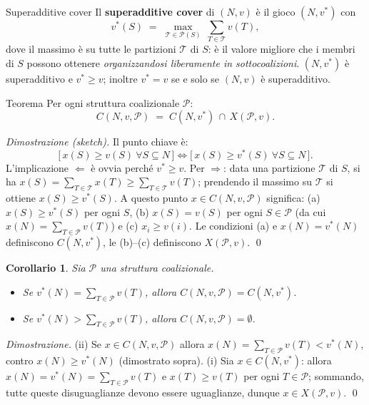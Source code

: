 \documentclass[12pt,a4paper,twoside]{book}
\theoremstyle{plain}
\newtheorem{corollary}[theorem]{Corollario}
\theoremstyle{definition}
\begin{document}
\begin{defbox}{Superadditive cover}
Il \textbf{superadditive cover} di $(N,v)$ è il gioco $(N,v^{*})$ con
\[
  v^{*}(S)\;=\;\max_{\mathcal{T}\in\mathcal{P}(S)}\ \sum_{T\in\mathcal{T}} v(T),
\]
dove il massimo è su tutte le partizioni $\mathcal{T}$ di $S$: è il valore
migliore che i membri di $S$ possono ottenere \emph{organizzandosi
liberamente in sottocoalizioni}. $(N,v^{*})$ è superadditivo e $v^{*}\ge v$;
inoltre $v^{*}=v$ se e solo se $(N,v)$ è superadditivo.
\end{defbox}

\begin{thmbox}{Teorema}
Per ogni struttura coalizionale $\mathcal{P}$:
\[
  C(N,v,\mathcal{P})\;=\;C(N,v^{*})\,\cap\,X(\mathcal{P},v).
\]
\end{thmbox}

\textit{Dimostrazione (sketch).} Il punto chiave è:
\[
  \bigl[\,x(S)\ge v(S)\ \forall S\subseteq N\,\bigr]
  \iff
  \bigl[\,x(S)\ge v^{*}(S)\ \forall S\subseteq N\,\bigr].
\]
L'implicazione $\Leftarrow$ è ovvia perché $v^{*}\ge v$. Per $\Rightarrow$: data
una partizione $\mathcal{T}$ di $S$, si ha
$x(S)=\sum_{T\in\mathcal{T}}x(T)\ge\sum_{T\in\mathcal{T}}v(T)$; prendendo il
massimo su $\mathcal{T}$ si ottiene $x(S)\ge v^{*}(S)$. A questo punto
$x\in C(N,v,\mathcal{P})$ significa: (a) $x(S)\ge v^{*}(S)$ per ogni $S$, (b)
$x(S)=v(S)$ per ogni $S\in\mathcal{P}$ (da cui $x(N)=\sum_{T\in\mathcal{P}}v(T)$)
e (c) $x_i\ge v(i)$. Le condizioni (a) e $x(N)=v^{*}(N)$ definiscono $C(N,v^{*})$,
le (b)--(c) definiscono $X(\mathcal{P},v)$. \qed

\begin{corollary}
Sia $\mathcal{P}$ una struttura coalizionale.
\begin{itemize}
  \item[(i)] Se $v^{*}(N)=\sum_{T\in\mathcal{P}}v(T)$, allora $C(N,v,\mathcal{P})=C(N,v^{*})$.
  \item[(ii)] Se $v^{*}(N)>\sum_{T\in\mathcal{P}}v(T)$, allora $C(N,v,\mathcal{P})=\emptyset$.
\end{itemize}
\end{corollary}

\textit{Dimostrazione.} (ii) Se $x\in C(N,v,\mathcal{P})$ allora
$x(N)=\sum_{T\in\mathcal{P}}v(T)<v^{*}(N)$, contro $x(N)\ge v^{*}(N)$ (dimostrato
sopra). (i) Sia $x\in C(N,v^{*})$: allora $x(N)=v^{*}(N)=\sum_{T\in\mathcal{P}}v(T)$
e $x(T)\ge v(T)$ per ogni $T\in\mathcal{P}$; sommando, tutte queste disuguaglianze
devono essere uguaglianze, dunque $x\in X(\mathcal{P},v)$. \qed
\end{document}
